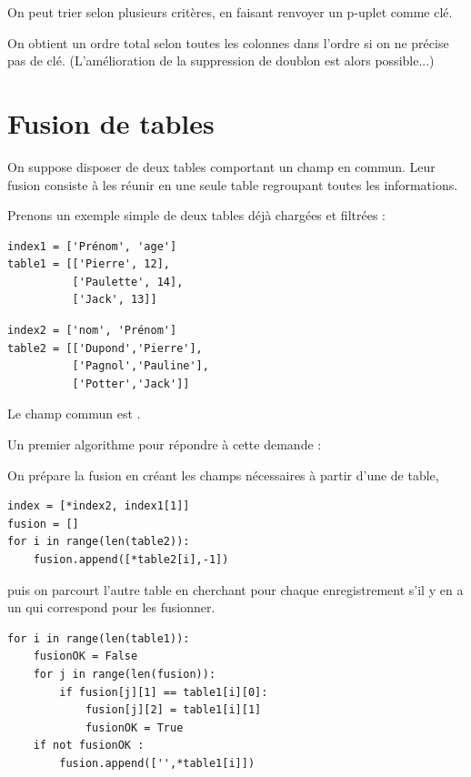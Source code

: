 {On peut trier selon plusieurs critères, en faisant renvoyer un p-uplet comme clé.

On obtient un ordre total selon toutes les colonnes dans l'ordre si on ne précise pas de clé.
(L'amélioration de la suppression de doublon est alors possible...)

%
%

\section{Fusion de tables}

On suppose disposer de deux tables comportant un champ en commun. Leur fusion consiste à les réunir en une seule table regroupant toutes les informations.

Prenons un exemple simple de deux tables déjà chargées et filtrées :

\begin{multicols}{2}

\begin{verbatim}
index1 = ['Prénom', 'age']
table1 = [['Pierre', 12],
          ['Paulette', 14],
          ['Jack', 13]]
\end{verbatim}

\begin{verbatim}
index2 = ['nom', 'Prénom']
table2 = [['Dupond','Pierre'],
          ['Pagnol','Pauline'],
          ['Potter','Jack']]
\end{verbatim}
\end{multicols}

Le champ commun est .

Un premier algorithme pour répondre à cette demande : 

On prépare la fusion en créant les champs nécessaires à partir d'une de table,

\begin{verbatim}
index = [*index2, index1[1]]
fusion = []
for i in range(len(table2)):
    fusion.append([*table2[i],-1])
\end{verbatim}

 puis on parcourt l'autre table en cherchant pour chaque enregistrement s'il y en a un qui correspond pour les fusionner.
 
\begin{verbatim}
for i in range(len(table1)):
    fusionOK = False
    for j in range(len(fusion)):
        if fusion[j][1] == table1[i][0]:
            fusion[j][2] = table1[i][1]
            fusionOK = True
    if not fusionOK :
        fusion.append(['',*table1[i]])
\end{verbatim}

}
